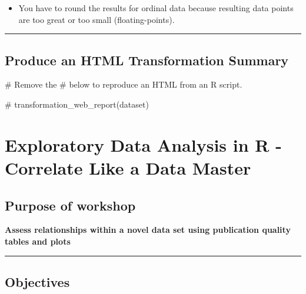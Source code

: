 \documentclass[
  letterpaper,
  DIV=11,
  numbers=noendperiod]{scrreprt}
\newenvironment{Shaded}{\begin{snugshade}}{\end{snugshade}}
\newcommand{\CommentTok}[1]{\textcolor[rgb]{0.37,0.37,0.37}{#1}}
\providecommand{\tightlist}{%
  \setlength{\itemsep}{0pt}\setlength{\parskip}{0pt}}\usepackage{longtable,booktabs,array}
\begin{document}
\begin{itemize}
\tightlist
\item
  You have to round the results for ordinal data because resulting data
  points are too great or too small (floating-points).
\end{itemize}

\begin{center}\rule{0.5\linewidth}{0.5pt}\end{center}

\hypertarget{produce-an-html-transformation-summary-1}{%
\section{Produce an HTML Transformation
Summary}\label{produce-an-html-transformation-summary-1}}

\begin{Shaded}
\begin{Highlighting}[]
\CommentTok{\# Remove the \textquotesingle{}\#\textquotesingle{} below to reproduce an HTML from an R script. }

\CommentTok{\# transformation\_web\_report(dataset)}
\end{Highlighting}
\end{Shaded}


\hypertarget{exploratory-data-analysis-in-r---correlate-like-a-data-master-1}{%
\chapter{Exploratory Data Analysis in R - Correlate Like a Data
Master}\label{exploratory-data-analysis-in-r---correlate-like-a-data-master-1}}

\hypertarget{purpose-of-workshop-5}{%
\section{Purpose of workshop}\label{purpose-of-workshop-5}}

\textbf{Assess relationships within a novel data set using publication
quality tables and plots}

\begin{center}\rule{0.5\linewidth}{0.5pt}\end{center}

\hypertarget{objectives-4}{%
\section{Objectives}\label{objectives-4}}
\end{document}
